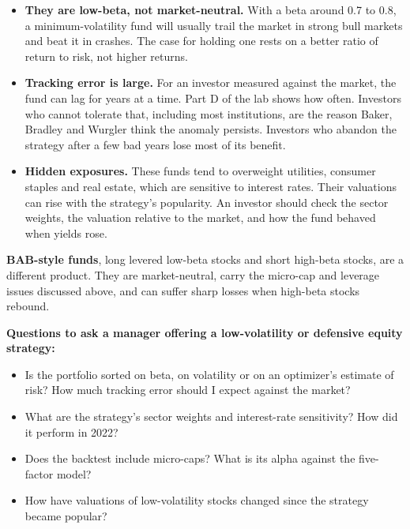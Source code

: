 \begin{itemize}
  \item \textbf{They are low-beta, not market-neutral.} With a beta around 0.7 to 0.8, a minimum-volatility fund will usually trail the market in strong bull markets and beat it in crashes. The case for holding one rests on a better ratio of return to risk, not higher returns.
  \item \textbf{Tracking error is large.} For an investor measured against the market, the fund can lag for years at a time. Part D of the lab shows how often. Investors who cannot tolerate that, including most institutions, are the reason Baker, Bradley and Wurgler think the anomaly persists. Investors who abandon the strategy after a few bad years lose most of its benefit.
  \item \textbf{Hidden exposures.} These funds tend to overweight utilities, consumer staples and real estate, which are sensitive to interest rates. Their valuations can rise with the strategy's popularity. An investor should check the sector weights, the valuation relative to the market, and how the fund behaved when yields rose.
\end{itemize}

\textbf{BAB-style funds}, long levered low-beta stocks and short high-beta stocks, are a different product. They are market-neutral, carry the micro-cap and leverage issues discussed above, and can suffer sharp losses when high-beta stocks rebound.

\textbf{Questions to ask a manager offering a low-volatility or defensive equity strategy:}

\begin{itemize}
  \item Is the portfolio sorted on beta, on volatility or on an optimizer's estimate of risk? How much tracking error should I expect against the market?
  \item What are the strategy's sector weights and interest-rate sensitivity? How did it perform in 2022?
  \item Does the backtest include micro-caps? What is its alpha against the five-factor model?
  \item How have valuations of low-volatility stocks changed since the strategy became popular?
\end{itemize}

